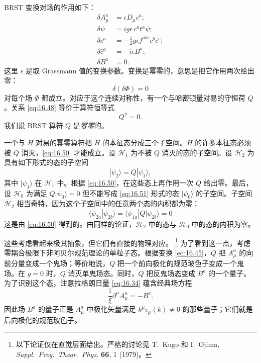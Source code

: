 BRST 变换对场的作用如下：
\begin{equation}
  \begin{aligned}
    \delta A^a_\mu &= \epsilon D_\mu c^a;\\
    \delta\psi &= ig\epsilon\,c^a t^a\psi;\\
    \delta c^a &= -\frac{1}{2}g\epsilon f^{abc}c^b c^c;\\
    \delta\bar{c}^a &= -i\epsilon B^a;\\
    \delta B^a &= 0 .
  \end{aligned}
  \label{eq:16.45}
\end{equation}
这里 $\epsilon$ 是取 Grassmann 值的变换参数。变换是幂零的，意思是把它作用两次给出零：
\begin{equation}
  \delta(\delta\Phi) = 0
  \label{eq:16.48}
\end{equation}
对每个场 $\Phi$ 都成立。对应于这个连续对称性，有一个与哈密顿量对易的守恒荷 $Q$。关系 \eqref{eq:16.48} 等价于算符恒等式
\begin{equation}
  Q^2 = 0 .
  \label{eq:16.50}
\end{equation}
我们说 BRST 算符 $Q$ 是\emph{幂零}的。

一个与 $H$ 对易的幂零算符把 $H$ 的本征态分成三个子空间。$H$ 的许多本征态必须被 $Q$ 消灭，\eqref{eq:16.50} 才能成立。设 $\mathcal{H}_1$ 为不被 $Q$ 消灭的态的子空间。设 $\mathcal{H}_2$ 为具有如下形式的态的子空间
\begin{equation}
  |\psi_2\rangle = Q|\psi_1\rangle ,
  \label{eq:16.51}
\end{equation}
其中 $|\psi_1\rangle$ 在 $\mathcal{H}_1$ 中。根据 \eqref{eq:16.50}，在这些态上再作用一次 $Q$ 给出零。最后，设 $\mathcal{H}_0$ 为满足 $Q|\psi_0\rangle = 0$ 但不能写成 \eqref{eq:16.51} 形式的态 $|\psi_0\rangle$ 的子空间。子空间 $\mathcal{H}_2$ 相当奇特，因为这个子空间中的任意两个态的内积都为零：
\begin{equation}
  \langle\psi_{2a}|\psi_{2b}\rangle = \langle\psi_{1a}|Q|\psi_{2b}\rangle
  = 0
  \label{eq:16.52}
\end{equation}
这是由 \eqref{eq:16.50} 得到的。由同样的论证，$\mathcal{H}_2$ 中的态与 $\mathcal{H}_0$ 中的态的内积为零。

这些考虑看起来极其抽象，但它们有直接的物理对应。%
\footnote{以下论证仅在直觉层面给出。严格的讨论见 T.~Kugo 和 I.~Ojima, \emph{Suppl.\ Prog.\ Theor.\ Phys.} \textbf{66}, 1 (1979)。} 为了看到这一点，考虑零耦合极限下非阿贝尔规范理论的单粒子态。根据变换 \eqref{eq:16.45}，$Q$ 把 $A^a_\mu$ 的向前分量变成一个鬼场；等价地说，$Q$ 把一个前向极化的规范玻色子变成一个鬼场。在 $g = 0$ 时，$Q$ 消灭单鬼场态。同时，$Q$ 把反鬼场态变成 $B^a$ 的一个量子。为了识别这个态，注意拉格朗日量 \eqref{eq:16.34} 蕴含经典场方程
\begin{equation}
  \frac{1}{\xi}\partial^\mu A^a_\mu = -B^a .
  \label{eq:16.53}
\end{equation}
因此场 $B^a$ 的量子正是 $A^a_\mu$ 中极化矢量满足 $k^\mu\epsilon_\mu(k) \neq 0$ 的那些量子；它们就是后向极化的规范玻色子。

